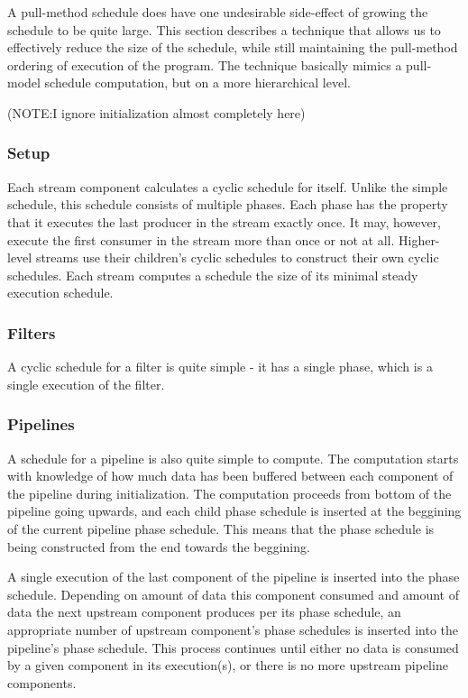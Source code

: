 A pull-method schedule does have one undesirable side-effect of growing the
schedule to be quite large.  This section describes a technique that allows
us to effectively reduce the size of the schedule, while still maintaining
the pull-method ordering of execution of the program.  The technique 
basically mimics a pull-model schedule computation, but on a more
hierarchical level.

(NOTE:I ignore initialization almost completely here)

\subsubsection{Setup}

Each stream component calculates a cyclic schedule for itself.  Unlike the
simple schedule, this schedule consists of multiple phases.  Each phase has
the property that it executes the last producer in the stream exactly once.
It may, however, execute the first consumer in the stream more than once
or not at all.  Higher-level streams use their children's cyclic schedules 
to construct their own cyclic schedules.  Each stream computes a schedule 
the size of its minimal steady execution schedule.

\subsubsection{Filters}

A cyclic schedule for a filter is quite simple - it has a single phase,
which is a single execution of the filter.

\subsubsection{Pipelines}

A schedule for a pipeline is also quite simple to compute.  The
computation starts with knowledge of how much data has been buffered
between each component of the pipeline during initialization.  The
computation proceeds from bottom of the pipeline going upwards, and each
child phase schedule is inserted at the beggining of the current pipeline
phase schedule.  This means that the phase schedule is being constructed
from the end towards the beggining.

A single execution of the last component of the pipeline is inserted into
the phase schedule.  Depending on amount of data this component consumed
and amount of data the next upstream component produces per its phase
schedule, an appropriate number of upstream component's phase schedules is
inserted into the pipeline's phase schedule.  This process continues until
either no data is consumed by a given component in its execution(s), or
there is no more upstream pipeline components.

